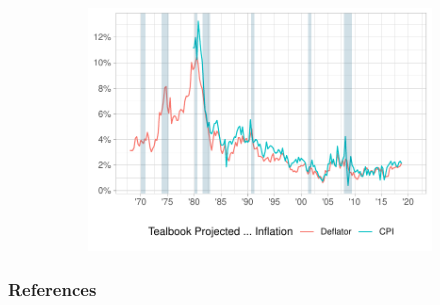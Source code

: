 \documentclass[11pt,pdf,aspectratio=129]{beamer}
\begin{document}
\begin{frame}
\begin{figure}
\begin{subfigure}[b]{0.46\textwidth}
            \includegraphics[width=\textwidth]{expected_inflation_plot.pdf}
            \end{subfigure}
        \end{figure}
    \end{frame}


\begin{frame}[t, allowframebreaks]
    \frametitle{References}
   
    
    \end{frame}
\end{document}
